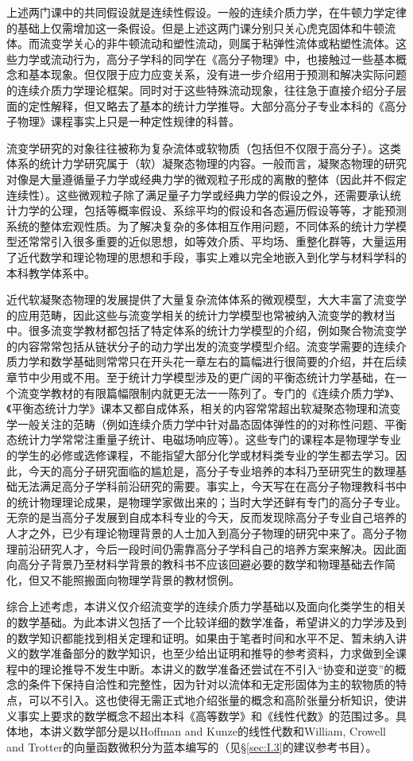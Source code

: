 \documentclass[main.tex]{subfiles}
\begin{document}
上述两门课中的共同假设就是连续性假设。一般的连续介质力学，在牛顿力学定律的基础上仅需增加这一条假设。但是上述这两门课分别只关心虎克固体和牛顿流体。而流变学关心的非牛顿流动和塑性流动，则属于粘弹性流体或粘塑性流体。这些力学或流动行为，高分子学科的同学在《高分子物理》中，也接触过一些基本概念和基本现象。但仅限于应力应变关系，没有进一步介绍用于预测和解决实际问题的连续介质力学理论框架。同时对于这些特殊流动现象，往往急于直接介绍分子层面的定性解释，但又略去了基本的统计力学推导。大部分高分子专业本科的《高分子物理》课程事实上只是一种定性规律的科普。

流变学研究的对象往往被称为复杂流体或软物质（包括但不仅限于高分子）。这类体系的统计力学研究属于（软）凝聚态物理的内容。一般而言，凝聚态物理的研究对像是大量遵循量子力学或经典力学的微观粒子形成的离散的整体（因此并不假定连续性）。这些微观粒子除了满足量子力学或经典力学的假设之外，还需要承认统计力学的公理，包括等概率假设、系综平均的假设和各态遍历假设等等，才能预测系统的整体宏观性质。为了解决复杂的多体相互作用问题，不同体系的统计力学模型还常常引入很多重要的近似思想，如等效介质、平均场、重整化群等，大量运用了近代数学和理论物理的思想和手段，事实上难以完全地嵌入到化学与材料学科的本科教学体系中。

近代软凝聚态物理的发展提供了大量复杂流体体系的微观模型，大大丰富了流变学的应用范畴，因此这些与流变学相关的统计力学模型也常被纳入流变学的教材当中。很多流变学教材都包括了特定体系的统计力学模型的介绍，例如聚合物流变学的内容常常包括从链状分子的动力学出发的流变学模型介绍。流变学需要的连续介质力学和数学基础则常常只在开头花一章左右的篇幅进行很简要的介绍，并在后续章节中少用或不用。至于统计力学模型涉及的更广阔的平衡态统计力学基础，在一个流变学教材的有限篇幅限制内就更无法一一陈列了。专门的《连续介质力学》、《平衡态统计力学》课本又都自成体系，相关的内容常常超出软凝聚态物理和流变学一般关注的范畴（例如连续介质力学中针对晶态固体弹性的的对称性问题、平衡态统计力学常常注重量子统计、电磁场响应等）。这些专门的课程本是物理学专业的学生的必修或选修课程，不能指望大部分化学或材料类专业的学生都去学习。因此，今天的高分子研究面临的尴尬是，高分子专业培养的本科乃至研究生的数理基础无法满足高分子学科前沿研究的需要。事实上，今天写在在高分子物理教科书中的统计物理理论成果，是物理学家做出来的；当时大学还鲜有专门的高分子专业。无奈的是当高分子发展到自成本科专业的今天，反而发现除高分子专业自己培养的人才之外，已少有理论物理背景的人士加入到高分子物理的研究中来了。高分子物理前沿研究人才，今后一段时间仍需靠高分子学科自己的培养方案来解决。因此面向高分子背景乃至材料学背景的教科书不应该回避必要的数学和物理基础去作简化，但又不能照搬面向物理学背景的教材惯例。

综合上述考虑，本讲义仅介绍流变学的连续介质力学基础以及面向化类学生的相关的数学基础。为此本讲义包括了一个比较详细的数学准备，希望讲义的力学涉及到的数学知识都能找到相关定理和证明。如果由于笔者时间和水平不足、暂未纳入讲义的数学准备部分的数学知识，也至少给出证明和推导的参考资料，力求做到全课程中的理论推导不发生中断。本讲义的数学准备还尝试在不引入“协变和逆变”的概念的条件下保持自洽性和完整性，因为针对以流体和无定形固体为主的软物质的特点，可以不引入。这也使得无需正式地介绍张量的概念和高阶张量分析知识，使讲义事实上要求的数学概念不超出本科《高等数学》和《线性代数》的范围过多。具体地，本讲义数学部分是以Hoffman and Kunze的线性代数和William, Crowell and Trotter的向量函数微积分为蓝本编写的（见\S \ref{sec:I.3}的建议参考书目）。
\end{document}
